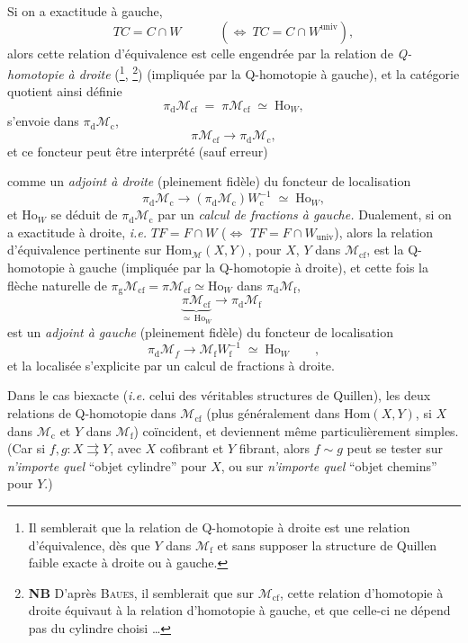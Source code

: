 \documentclass[11pt]{article}
\newcommand{\printedpage}[1]{\marginpar{\footnotesize p.~#1}}
\newcommand{\msp}[1]{\marginpar{\footnotesize [#1]}}
\newcommand{\cM}{\mathcal{M}}
\newcommand{\univ}{\mathrm{univ}}
\begin{document}
Si on a exactitude à gauche,
\[
TC = C \cap W \qquad\quad (\Longleftrightarrow\ TC = C \cap W^{\univ}),
\]
alors cette relation d'équivalence est celle engendrée par la relation de \textit{Q-homotopie à droite} (\footnote[22]{Il semblerait que la relation de Q-homotopie à droite est une relation d'équivalence, dès que $Y$ dans $\mathcal{M}_{\mathrm{f}}$ et sans supposer la structure de Quillen faible exacte à droite ou à gauche.}, \footnote[23]{\textbf{NB} D'après \textsc{Baues}, il semblerait que sur $\mathcal{M}_{\mathrm{cf}}$, cette relation d'homotopie à droite équivaut à la relation d'homotopie à gauche, et que celle-ci ne dépend pas du cylindre choisi \ldots}) (impliquée par la Q-homotopie à gauche), et la catégorie quotient ainsi définie
\[
\pi_{\mathrm{d}}\mathcal{M}_{\mathrm{cf}} \;=\; \pi\mathcal{M}_{\mathrm{cf}} \;\simeq\; \mathrm{Ho}_W,
\]
s'envoie dans $\pi_{\mathrm{d}}\mathcal{M}_{\mathrm{c}}$,
\[
\pi\mathcal{M}_{\mathrm{cf}} \longrightarrow \pi_{\mathrm{d}}\mathcal{M}_{\mathrm{c}},
\]
et ce foncteur peut être interprété (sauf erreur)

\setcounter{footnote}{23}

\printedpage{19}
\msp{page 31}
comme un \textit{adjoint à droite} (pleinement fidèle) du foncteur de localisation
\[
\pi_{\mathrm{d}}\cM_{\mathrm{c}} \longrightarrow (\pi_{\mathrm{d}}\cM_{\mathrm{c}})W_{\mathrm{c}}^{-1} \;\simeq\; \mathrm{Ho}_W,
\]
et $\mathrm{Ho}_W$ se déduit de $\pi_{\mathrm{d}}\cM_{\mathrm{c}}$ par un \textit{calcul de fractions à gauche.} Dualement, si on a exactitude à droite, \textit{i.e.} $TF = F\cap W$ ($\Longleftrightarrow$ $TF = F\cap W_{\mathrm{univ}}$), alors la relation d'équivalence pertinente sur $\mathrm{Hom}_{\cM}(X,Y)$, pour $X$, $Y$ dans $\cM_{\mathrm{cf}}$, est la Q-homotopie à gauche (impliquée par la Q-homotopie à droite), et cette fois la flèche naturelle de $\pi_{\mathrm{g}}\cM_{\mathrm{cf}} = \pi\cM_{\mathrm{cf}} \simeq \mathrm{Ho}_W$ dans $\pi_{\mathrm{d}}\cM_{\mathrm{f}}$,
\[
\underbrace{\pi\cM_{\mathrm{cf}}}_{\simeq\,\mathrm{Ho}_W} \longrightarrow \pi_{\mathrm{d}}\cM_{\mathrm{f}} \qquad 
\]
est un \textit{adjoint à gauche} (pleinement fidèle) du foncteur de localisation
\[
\pi_{\mathrm{d}}\cM_f \longrightarrow \cM_{\mathrm{f}}W_{\mathrm{f}}^{-1} \;\simeq\; \mathrm{Ho}_W \qquad, %
\]
et la localisée s'explicite par un calcul de fractions à droite.

Dans le cas biexacte (\textit{i.e.} celui des véritables structures de Quillen), les deux relations de Q-homotopie dans $\cM_{\mathrm{cf}}$ (plus généralement dans $\mathrm{Hom}(X,Y)$, si $X$ dans $\cM_{\mathrm{c}}$ et $Y$ dans $\cM_{\mathrm{f}}$)
\msp{page 32}
coïncident, et deviennent même particulièrement simples. (Car si $f, g : X \rightrightarrows Y$, avec $X$ cofibrant et $Y$ fibrant, alors $f\sim g$ peut se tester sur \textit{n'importe quel} “objet cylindre” pour $X$, ou sur \textit{n'importe quel} “objet chemins” pour $Y$.)
\end{document}
